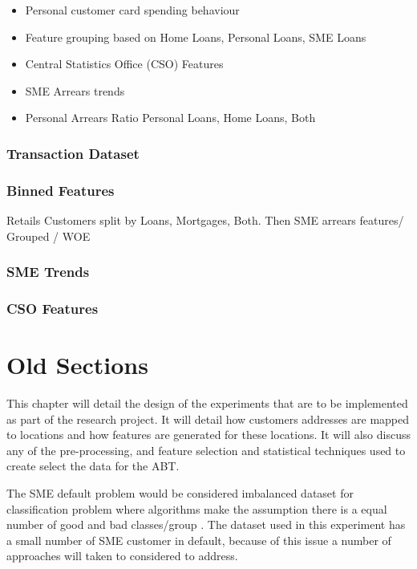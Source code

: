 \begin{itemize}
	\item Personal customer card spending behaviour
	\item Feature grouping based on Home Loans, Personal Loans, SME Loans
	\item Central Statistics Office (CSO) Features
	\item SME Arrears trends
	\item Personal Arrears Ratio Personal Loans, Home Loans, Both
\end{itemize}


\subsubsection{Transaction Dataset}

\subsubsection{Binned Features}

Retails Customers split by Loans, Mortgages, Both. Then SME arrears features/
Grouped / WOE 

\subsubsection{SME Trends}

\subsubsection{CSO Features}



\section{Old Sections}
This chapter will detail the design of the experiments that are to be implemented as part of the research project. It will detail how customers addresses are mapped to locations and how features are generated for these locations. It will also discuss any of the pre-processing, and feature selection and statistical techniques used to create select the data for the ABT.

The SME default problem would be considered imbalanced dataset for classification problem where algorithms make the assumption there is a equal number of good and bad classes/group \citep{japkowicz_class_2000}. The dataset used in this experiment has a small number of SME customer in default, because of this issue a number of approaches will taken to considered to address.

